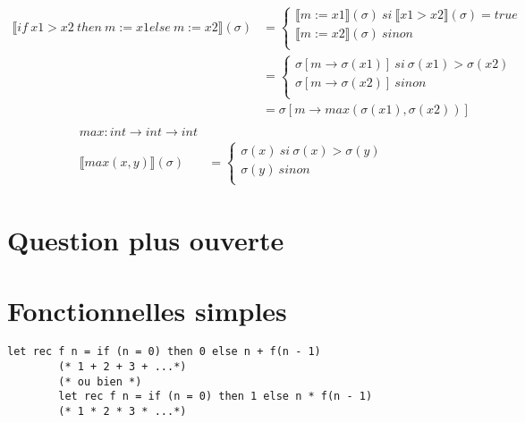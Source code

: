 \documentclass[11pt,a4paper]{article}
\newcommand{\llbr}{\llbracket}
\newcommand{\rrbr}{\rrbracket}
\begin{document}
	\begin{align*}
		  \llbr if\ x1 > x2\ then\ m := x1 else\ m := x2  \rrbr (\sigma) &=
		\begin{cases}
			  \llbr m := x1  \rrbr (\sigma)\ si\   \llbr x1 > x2  \rrbr (\sigma) = true\\
			  \llbr m := x2  \rrbr (\sigma)\ sinon\\
		\end{cases}\\
		&=
		\begin{cases}
			\sigma[m \to \sigma(x1)]\ si\ \sigma(x1) > \sigma(x2)\\
			\sigma[m \to \sigma(x2)]\ sinon\\
		\end{cases}\\
		&= \sigma[m \to max(\sigma(x1), \sigma(x2))]\\
	\end{align*}
	\begin{align*}
		max : int \to int \to int&\\
		  \llbr max(x,y)  \rrbr (\sigma) &=
		\begin{cases}
			\sigma(x)\ si\ \sigma(x) > \sigma(y)\\
			\sigma(y)\ sinon\\
		\end{cases}
	\end{align*}
	
	\section{Question plus ouverte}
	
	\section{Fonctionnelles simples}
	

	\begin{lstlisting}[language=caml,caption=?]
		let rec f n = if (n = 0) then 0 else n + f(n - 1)
		(* 1 + 2 + 3 + ...*)
		(* ou bien *)
		let rec f n = if (n = 0) then 1 else n * f(n - 1)
		(* 1 * 2 * 3 * ...*)
	\end{lstlisting}
	
\end{document}
